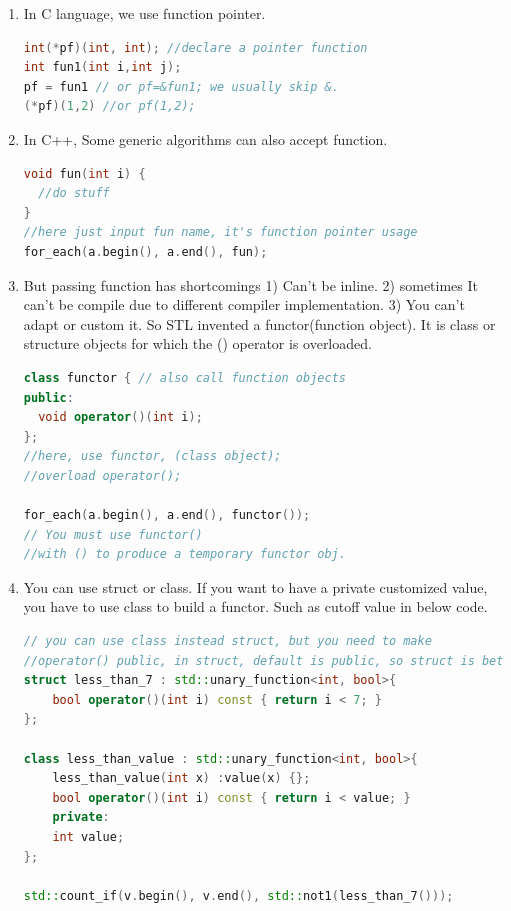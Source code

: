 \documentclass[a4paper,12pt,twoside]{book}
\begin{document}
\begin{enumerate}
\item  In C language, we use function pointer.
\begin{lstlisting}[frame=single, language=c++]
int(*pf)(int, int); //declare a pointer function
int fun1(int i,int j);
pf = fun1 // or pf=&fun1; we usually skip &.
(*pf)(1,2) //or pf(1,2);
\end{lstlisting}

\item In C++, Some generic algorithms can also accept function.
\begin{lstlisting}[frame=single, language=c++]
void fun(int i) {
  //do stuff
}
//here just input fun name, it's function pointer usage
for_each(a.begin(), a.end(), fun);
\end{lstlisting}

\item But passing function has shortcomings 1) Can't be inline. 2) sometimes It can't be compile due to different compiler implementation. 3) You can't adapt or custom it. So STL invented a functor(function object). It is class or structure objects for which the () operator is overloaded.

\begin{lstlisting}[frame=single, language=c++]
class functor { // also call function objects
public:
  void operator()(int i);
};
//here, use functor, (class object);
//overload operator();

for_each(a.begin(), a.end(), functor());
// You must use functor()
//with () to produce a temporary functor obj.
\end{lstlisting}

\item  You can use struct or class. If you want to have a private customized  value, you have to use class to build a functor.  Such as cutoff value in below code.
\begin{lstlisting}[frame=single, language=c++]
// you can use class instead struct, but you need to make
//operator() public, in struct, default is public, so struct is better!
struct less_than_7 : std::unary_function<int, bool>{
    bool operator()(int i) const { return i < 7; }
};

class less_than_value : std::unary_function<int, bool>{
    less_than_value(int x) :value(x) {};
    bool operator()(int i) const { return i < value; }
    private:
    int value;
};

std::count_if(v.begin(), v.end(), std::not1(less_than_7()));
\end{lstlisting}



\end{enumerate}
\end{document}
